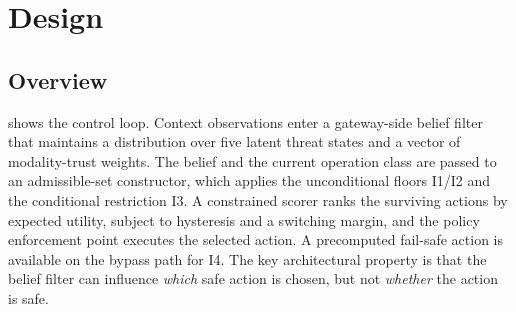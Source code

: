 \section{Design}
\label{sec:design}

\subsection{Overview}
\label{sec:design-overview}

 shows the control loop. Context observations enter a
gateway-side belief filter that maintains a distribution over five latent threat
states and a vector of modality-trust weights. The belief and the current
operation class are passed to an admissible-set constructor, which applies the
unconditional floors I1/I2 and the conditional restriction I3. A constrained
scorer ranks the surviving actions by expected utility, subject to hysteresis
and a switching margin, and the policy enforcement point executes the selected
action. A precomputed fail-safe action is available on the bypass path for I4.
The key architectural property is that the belief filter can influence
\emph{which} safe action is chosen, but not \emph{whether} the action is safe.

